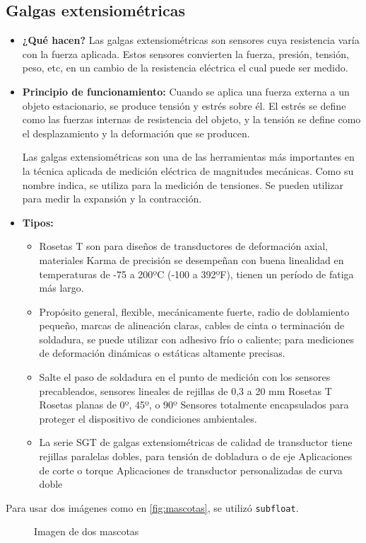 \subsection*{Galgas extensiométricas}
\begin{itemize}
	\item \textbf{¿Qué hacen?} Las galgas extensiométricas son sensores cuya resistencia varía con la fuerza aplicada. Estos sensores convierten la fuerza, presión, tensión, peso, etc, en un cambio de la resistencia eléctrica el cual puede ser medido.
	\item \textbf{Principio de funcionamiento:} Cuando se aplica una fuerza externa a un objeto estacionario, se produce tensión y estrés sobre él. El estrés se define como las fuerzas internas de resistencia del objeto, y la tensión se define como el desplazamiento y la deformación que se producen.
	
	Las galgas extensiométricas son una de las herramientas más importantes en la técnica aplicada de medición eléctrica de magnitudes mecánicas. Como su nombre indica, se utiliza para la medición de tensiones. Se pueden utilizar para medir la expansión y la contracción.
	\item \textbf{Tipos:}
	\begin{itemize}
		\item {} Rosetas T son para diseños de transductores de deformación axial, materiales Karma de precisión se desempeñan con buena linealidad en temperaturas de -75 a 200ºC (-100 a 392ºF), tienen un período de fatiga más largo.
		\item {} Propósito general, flexible, mecánicamente fuerte, radio de doblamiento pequeño, marcas de alineación claras, cables de cinta o terminación de soldadura, se puede utilizar con adhesivo frío o caliente; para mediciones de deformación dinámicas o estáticas altamente precisas.
		\item {} Salte el paso de soldadura en el punto de medición con los sensores precableados, sensores lineales de rejillas de 0,3 a 20 mm
		Rosetas T
		Rosetas planas de 0º, 45º, o 90º
		Sensores totalmente encapsulados para proteger el dispositivo de condiciones ambientales.
		\item {} La serie SGT de galgas extensiométricas de calidad de transductor tiene rejillas paralelas dobles, para tensión de dobladura o de eje
		Aplicaciones de corte o torque
		Aplicaciones de transductor personalizadas de curva doble
		
	\end{itemize}
\end{itemize}

Para usar dos imágenes como en \autoref{fig:mascotas}, se utilizó \texttt{subfloat}.
\begin{figure}[h]
	\centering
	\hfill
	\caption{Imagen de dos mascotas}
	\label{fig:mascotas}
\end{figure}